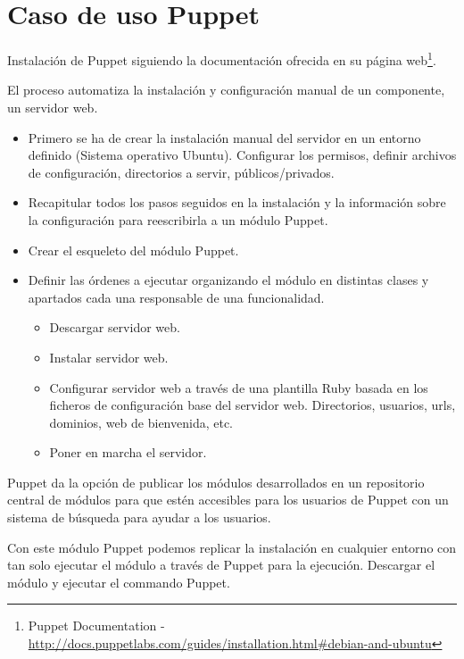 \chapter{Caso de uso Puppet}
\label{app:apendice-puppet}

\par Instalación de Puppet siguiendo la documentación ofrecida en su página web\footnote{Puppet Documentation - \url{http://docs.puppetlabs.com/guides/installation.html\#debian-and-ubuntu}}.

\par El proceso automatiza la instalación y configuración manual de un componente, un servidor web.

\begin{itemize}
	\item Primero se ha de crear la instalación manual del servidor en un entorno definido (Sistema operativo Ubuntu). Configurar los permisos, definir archivos de configuración, directorios a servir, públicos/privados.
	\item Recapitular todos los pasos seguidos en la instalación y la información sobre la configuración para reescribirla a un módulo Puppet.
	\item Crear el esqueleto del módulo Puppet.
	\item Definir las órdenes a ejecutar organizando el módulo en distintas clases y apartados cada una responsable de una funcionalidad.
	\begin{itemize}
	    \item Descargar servidor web.
	    \item Instalar servidor web.
	    \item Configurar servidor web a través de una plantilla Ruby basada en los ficheros de configuración base del servidor web. Directorios, usuarios, urls, dominios, web de bienvenida, etc.
	    \item Poner en marcha el servidor.
    \end{itemize}
\end{itemize}

\par Puppet da la opción de publicar los módulos desarrollados en un repositorio central de módulos para que estén accesibles para los usuarios de Puppet con un sistema de búsqueda para ayudar a los usuarios.

\par Con este módulo Puppet podemos replicar la instalación en cualquier entorno con tan solo ejecutar el módulo a través de Puppet para la ejecución. Descargar el módulo y ejecutar el commando Puppet.

